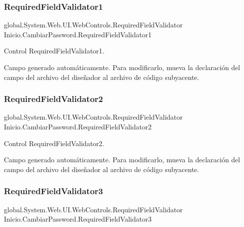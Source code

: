\subsubsection{\texorpdfstring{RequiredFieldValidator1}{RequiredFieldValidator1}}
{\footnotesize\ttfamily global.\+System.\+Web.\+U\+I.\+Web\+Controls.\+Required\+Field\+Validator Inicio.\+Cambiar\+Password.\+Required\+Field\+Validator1\hspace{0.3cm}{\ttfamily [protected]}}



Control Required\+Field\+Validator1. 

Campo generado automáticamente. Para modificarlo, mueva la declaración del campo del archivo del diseñador al archivo de código subyacente. \mbox{\label{class_inicio_1_1_cambiar_password_a955b645fae496e6d030ac5da64663fc7}} 
\subsubsection{\texorpdfstring{RequiredFieldValidator2}{RequiredFieldValidator2}}
{\footnotesize\ttfamily global.\+System.\+Web.\+U\+I.\+Web\+Controls.\+Required\+Field\+Validator Inicio.\+Cambiar\+Password.\+Required\+Field\+Validator2\hspace{0.3cm}{\ttfamily [protected]}}



Control Required\+Field\+Validator2. 

Campo generado automáticamente. Para modificarlo, mueva la declaración del campo del archivo del diseñador al archivo de código subyacente. \mbox{\label{class_inicio_1_1_cambiar_password_a618ca28dc9312f747d6f48cc9b11f132}} 
\subsubsection{\texorpdfstring{RequiredFieldValidator3}{RequiredFieldValidator3}}
{\footnotesize\ttfamily global.\+System.\+Web.\+U\+I.\+Web\+Controls.\+Required\+Field\+Validator Inicio.\+Cambiar\+Password.\+Required\+Field\+Validator3\hspace{0.3cm}{\ttfamily [protected]}}



